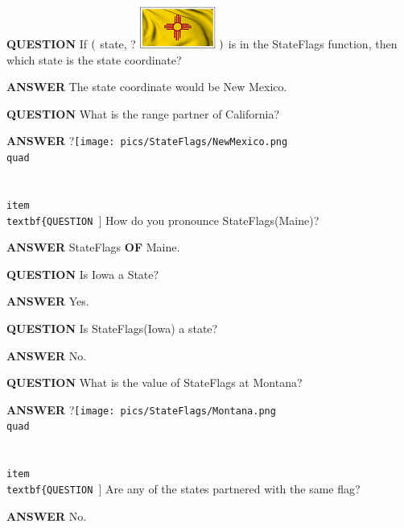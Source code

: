 \documentclass{ximera}
\begin{document}
\begin{dialogue}

\item [\textbf{QUESTION}] If  $\Large{(}$ state, ? \includegraphics{pics/StateFlags/NewMexico.png} $\Large{)}$  is in the StateFlags function, then which state is the state coordinate?

\item [\textbf{ANSWER}]  The state coordinate would be New Mexico.
\quad \\


\item [\textbf{QUESTION}] What is the range partner of California?
\item [\textbf{ANSWER}]    ?\texttt{[image: pics/StateFlags/NewMexico.png
\\quad \\\\


\\item [\\textbf\{QUESTION]}] How do you pronounce StateFlags(Maine)?
\item [\textbf{ANSWER}]   StateFlags \textbf{OF} Maine.
\quad \\


\item [\textbf{QUESTION}] Is Iowa a State?
\item [\textbf{ANSWER}]    Yes.
\quad \\

\item [\textbf{QUESTION}] Is StateFlags(Iowa) a state?
\item [\textbf{ANSWER}]    No.
\quad \\


\item [\textbf{QUESTION}] What is the value of StateFlags at Montana?
\item [\textbf{ANSWER}]   ?\texttt{[image: pics/StateFlags/Montana.png
\\quad \\\\


\\item [\\textbf\{QUESTION]}] Are any of the states partnered with the same flag?
\item [\textbf{ANSWER}]    No.


\end{dialogue}
\end{document}
